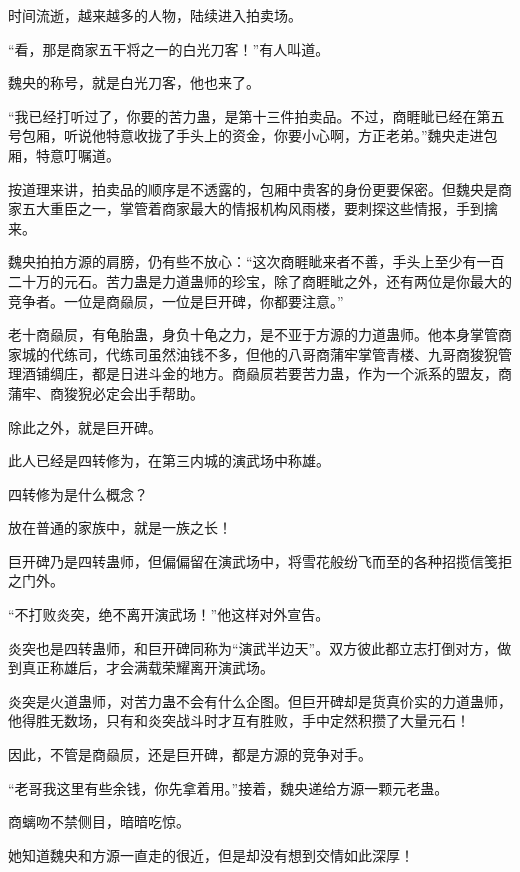 
\begin{this_body}

时间流逝，越来越多的人物，陆续进入拍卖场。

“看，那是商家五干将之一的白光刀客！”有人叫道。

魏央的称号，就是白光刀客，他也来了。

“我已经打听过了，你要的苦力蛊，是第十三件拍卖品。不过，商睚眦已经在第五号包厢，听说他特意收拢了手头上的资金，你要小心啊，方正老弟。”魏央走进包厢，特意叮嘱道。

按道理来讲，拍卖品的顺序是不透露的，包厢中贵客的身份更要保密。但魏央是商家五大重臣之一，掌管着商家最大的情报机构风雨楼，要刺探这些情报，手到擒来。

魏央拍拍方源的肩膀，仍有些不放心：“这次商睚眦来者不善，手头上至少有一百二十万的元石。苦力蛊是力道蛊师的珍宝，除了商睚眦之外，还有两位是你最大的竞争者。一位是商赑屃，一位是巨开碑，你都要注意。”

老十商赑屃，有龟胎蛊，身负十龟之力，是不亚于方源的力道蛊师。他本身掌管商家城的代练司，代练司虽然油钱不多，但他的八哥商蒲牢掌管青楼、九哥商狻猊管理酒铺绸庄，都是日进斗金的地方。商赑屃若要苦力蛊，作为一个派系的盟友，商蒲牢、商狻猊必定会出手帮助。

除此之外，就是巨开碑。

此人已经是四转修为，在第三内城的演武场中称雄。

四转修为是什么概念？

放在普通的家族中，就是一族之长！

巨开碑乃是四转蛊师，但偏偏留在演武场中，将雪花般纷飞而至的各种招揽信笺拒之门外。

“不打败炎突，绝不离开演武场！”他这样对外宣告。

炎突也是四转蛊师，和巨开碑同称为“演武半边天”。双方彼此都立志打倒对方，做到真正称雄后，才会满载荣耀离开演武场。

炎突是火道蛊师，对苦力蛊不会有什么企图。但巨开碑却是货真价实的力道蛊师，他得胜无数场，只有和炎突战斗时才互有胜败，手中定然积攒了大量元石！

因此，不管是商赑屃，还是巨开碑，都是方源的竞争对手。

“老哥我这里有些余钱，你先拿着用。”接着，魏央递给方源一颗元老蛊。

商螭吻不禁侧目，暗暗吃惊。

她知道魏央和方源一直走的很近，但是却没有想到交情如此深厚！


\end{this_body}
